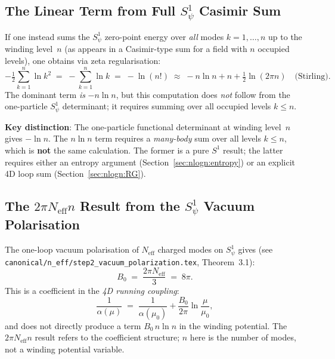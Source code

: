 \documentclass[12pt,a4paper]{article}
\theoremstyle{definition}
\theoremstyle{remark}
\newcommand{\Neff}{N_{\mathrm{eff}}}
\begin{document}
\subsection{The Linear Term from Full $S^1_\psi$ Casimir Sum}
\label{ssec:nlogn:casimir}

If one instead sums the $S^1_\psi$ zero-point energy over \emph{all} modes
$k = 1, \ldots, n$ up to the winding level~$n$ (as appears in a Casimir-type
sum for a field with $n$ occupied levels), one obtains via zeta regularisation:
\begin{equation}
  -\tfrac{1}{2}\sum_{k=1}^{n}\ln k^2
  \;=\;
  -\sum_{k=1}^{n}\ln k
  \;=\;
  -\ln(n!)
  \;\approx\;
  -n\ln n + n + \tfrac{1}{2}\ln(2\pi n)
  \quad\text{(Stirling)}.
  \label{eq:nlogn:stirling_sum}
\end{equation}
The dominant term \emph{is} $-n\ln n$, but this computation does \emph{not}
follow from the one-particle $S^1_\psi$ determinant; it requires summing over
all occupied levels $k \le n$.

\begin{insightbox}
\textbf{Key distinction}: The one-particle functional determinant at winding
level~$n$ gives $-\ln n$.  The $n\ln n$ term requires a \emph{many-body}
sum over all levels $k \le n$, which is \textbf{not} the same calculation.
The former is a pure $S^1$ result; the latter requires either an entropy
argument (Section~\ref{sec:nlogn:entropy}) or an explicit 4D loop sum
(Section~\ref{sec:nlogn:RG}).
\end{insightbox}

\subsection{The $2\pi\Neff n$ Result from the $S^1_\psi$ Vacuum Polarisation}
\label{ssec:nlogn:vacpol}

The one-loop vacuum polarisation of $\Neff$ charged modes on $S^1_\psi$
gives (see \texttt{canonical/n\_eff/step2\_vacuum\_polarization.tex},
Theorem~3.1):
\begin{equation}
  B_0 \;=\; \frac{2\pi\Neff}{3} \;=\; 8\pi.
  \label{eq:nlogn:B0}
\end{equation}
This is a coefficient in the \emph{4D running coupling}:
\begin{equation}
  \frac{1}{\alpha(\mu)} \;=\; \frac{1}{\alpha(\mu_0)} + \frac{B_0}{2\pi}\ln\frac{\mu}{\mu_0},
  \label{eq:nlogn:running}
\end{equation}
and does not directly produce a term $B_0\,n\ln n$ in the winding potential.
The $2\pi\Neff n$ result refers to the coefficient structure; $n$ here is the
number of modes, not a winding potential variable.
\end{document}
